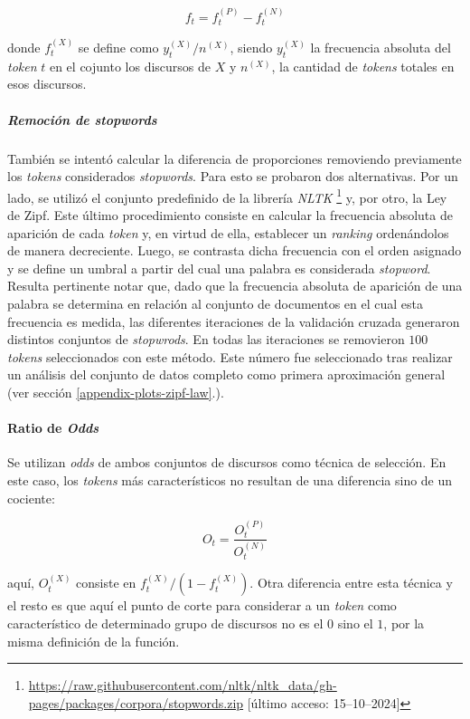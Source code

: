 \begin{equation}
    f_t = f_{t}^{(P)}-f_{t}^{(N)}
\end{equation}


donde $f_{t}^{(X)}$ se define como $y_{t}^{(X)} / n^{(X)}$, siendo $y_{t}^{(X)}$
la frecuencia absoluta del \textit{token} $t$ en el cojunto los discursos de $X$
y $n^{(X)}$, la cantidad de \textit{tokens} totales en esos discursos.

\subparagraph{Remoci\'on de \textit{stopwords}}
\label{paragraph-methods-proportions-stopwords}
Tambi\'en se intent\'o calcular la diferencia de proporciones removiendo
previamente los \textit{tokens} considerados \textit{stopwords}.
Para esto se probaron dos alternativas.
Por un lado, se utiliz\'o el conjunto predefinido de la librer\'ia \textit{NLTK}
\footnote{\url{https://raw.githubusercontent.com/nltk/nltk_data/gh-pages/packages/corpora/stopwords.zip} [\'ultimo acceso: 15--10--2024]}
y, por otro, la Ley de Zipf.
Este \'ultimo procedimiento consiste en calcular la frecuencia absoluta de aparici\'on de
cada \textit{token} y, en virtud de ella, establecer un \textit{ranking}
orden\'andolos de manera decreciente.
Luego, se contrasta dicha frecuencia con el orden asignado y se define
un umbral a partir del cual una palabra es considerada \textit{stopword}.
Resulta pertinente notar que, dado que la frecuencia absoluta de aparici\'on
de una palabra se determina en relaci\'on al conjunto de documentos en el cual
esta frecuencia es medida, las diferentes iteraciones de la validaci\'on cruzada
generaron distintos conjuntos de \textit{stopwrods}.
En todas las iteraciones se removieron $100$ \textit{tokens} seleccionados
con este m\'etodo. Este n\'umero fue seleccionado tras realizar un an\'alisis del
conjunto de datos completo como primera aproximaci\'on general (ver secci\'on
\ref{appendix-plots-zipf-law}.).

\paragraph{Ratio de \textit{Odds}}
Se utilizan \textit{odds} de ambos conjuntos de discursos como
t\'ecnica de selecci\'on. En este caso, los \textit{tokens} m\'as caracter\'isticos
no resultan de una diferencia sino de un cociente:

\begin{equation}
    O_{t} = \frac{O_{t}^{(P)}}{O_{t}^{(N)}}
\end{equation}

aqu\'i, $O_{t}^{(X)}$ consiste en $f_{t}^{(X)}/(1-f_{t}^{(X)})$.
Otra diferencia entre esta t\'ecnica y el resto es que aqu\'i el punto de
corte para considerar a un \textit{token} como caracter\'istico de
determinado grupo de discursos no es el $0$ sino el $1$, por la misma
definici\'on de la funci\'on.

